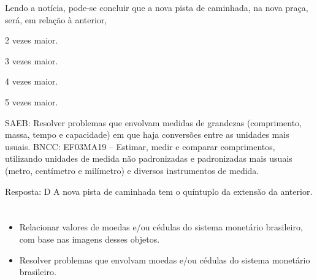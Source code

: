\begin{escolha}

Lendo a notícia, pode-se concluir que a nova pista de caminhada, na nova praça, será, em relação à anterior,

\begin{escolha}
\item
  2 vezes maior.
\item
  3 vezes maior.
\item
  4 vezes maior.
\item
  5 vezes maior.
\end{escolha}

SAEB: Resolver problemas que envolvam medidas de grandezas (comprimento, massa, tempo e capacidade) em que haja conversões entre as unidades mais usuais. 
BNCC: EF03MA19 -- Estimar, medir e comparar comprimentos, utilizando unidades de medida
não padronizadas e padronizadas mais usuais (metro, centímetro e milímetro) e diversos
instrumentos de medida.


Resposta: D
A nova pista de caminhada tem o quíntuplo da extensão da anterior.

\chapter{}


\begin{itemize}
    \item Relacionar valores de moedas e/ou cédulas do sistema monetário
brasileiro, com base nas imagens desses objetos.

    \item Resolver problemas que envolvam moedas e/ou cédulas do sistema
monetário brasileiro.
\end{itemize}


\end{escolha}
